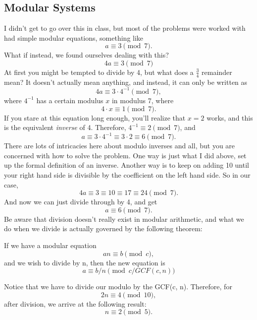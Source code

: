 \subsection{Modular Systems}
I didn't get to go over this in class, but most of the problems were worked with had simple modular equations, something like
$$a \equiv 3 \pmod{7}.$$
What if instead, we found ourselves dealing with this?
$$4a \equiv 3 \pmod{7}$$
At first you might be tempted to divide by 4, but what does a $\frac{3}{4}$ remainder mean? It doesn't actually mean anything, and instead, it can only be written as 
$$4a \equiv 3\cdot4^{-1} \pmod{7},$$
where $4^{-1}$ has a certain modulus $x$ in modulus 7, where 
$$4\cdot x\equiv 1 \pmod{7}.$$
If you stare at this equation long enough, you'll realize that $x=2$ works, and this is the equivalent \textit{inverse} of 4. Therefore, $4^{-1} \equiv 2 \pmod{7}$, and 
$$a \equiv 3\cdot4^{-1} \equiv 3\cdot2 \equiv 6 \pmod{7}.$$
There are lots of intricacies here about modulo inverses and all, but you are concerned with how to solve the problem. One way is just what I did above, set up the formal definition of an inverse. Another way is to keep on adding 10 until your right hand side is divisible by the coefficient on the left hand side. So in our case, 
$$4a \equiv 3 \equiv 10 \equiv 17 \equiv 24 \pmod{7}.$$
And now we can just divide through by 4, and get
$$a\equiv 6 \pmod{7}.$$
Be aware that division doesn't really exist in modular arithmetic, and what we do when we divide is actually governed by the following theorem:
\begin{theorem}
If we have a modular equation 
$$an \equiv b \pmod{c},$$
and we wish to divide by n, then the new equation is 
$$a \equiv b/n \pmod{c/GCF(c, n)}$$
\end{theorem}
Notice that we have to divide our modulo by the GCF(c, n). Therefore, for 
$$2n\equiv4 \pmod{10},$$
after division, we arrive at the following result:
$$n\equiv 2 \pmod{5}.$$
\clearpage
